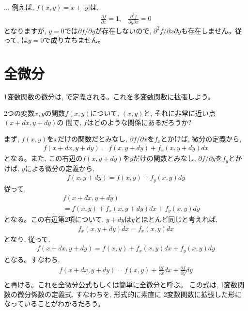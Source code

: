 \begin{faq}{\small{}\\
... 例えば, $f(x, y)=x+|y|$は, 
\begin{eqnarray*}
\frac{\partial f}{\partial x}=1,\,\,\,\,\,
\frac{\partial^2 f}{\partial y\partial x}=0
\end{eqnarray*}
となりますが, $y=0$では$\partial f/\partial y$が存在しないので, 
$\partial^2 f/\partial x\partial y$も存在しません。従って, 
は$y=0$で成り立ちません。}\end{faq}
\vv


\section{全微分}

1変数関数の微分は, で定義される。これを多変数関数に拡張しよう。

2つの変数$x, y$の関数$f(x,y)$について, $(x, y)$と, それに非常に近い点$(x+dx, y+dy)$の
間で, $f$はどのような関係にあるだろうか? 

まず, $f(x,y)$を$x$だけの関数だとみなし, $\partial f/\partial x$を$f_x$とかけば, 微分の定義から, 
\begin{eqnarray*}f(x+dx,y+dy) = f(x,y+dy) + f_x(x, y+dy)dx\end{eqnarray*}
となる。また, この右辺の$f(x,y+dy)$を$y$だけの関数とみなし, $\partial f/\partial y$を$f_y$とかけば, 
$y$による微分の定義から, 
\begin{eqnarray*}f(x,y+dy) = f(x, y) + f_y(x, y)dy\end{eqnarray*}
従って, 
\begin{eqnarray*}
&&f(x+dx,y+dy)\\
&&= f(x, y) + f_x(x, y+dy)dx + f_y(x, y)dy\end{eqnarray*}
となる。この右辺第2項について, $y+dy$は$y$とほとんど同じと考えれば, 
\begin{eqnarray*}f_x(x, y+dy)dx = f_x(x, y)dx\end{eqnarray*}
となり, 従って, 
\begin{eqnarray*}f(x+dx,y+dy) = f(x, y) + f_x(x, y)dx + f_y(x, y)dy\end{eqnarray*}
となる。すなわち, 
\begin{eqnarray}
f(x+dx,y+dy) = f(x, y)+ \frac{\partial f}{\partial x}dx+\frac{\partial f}{\partial y}dy\nonumber\\
\label{eq:def_2var_zenbibun}\end{eqnarray}
と書ける。これを\underline{全微分公式}もしくは簡単に\underline{全微分}と呼ぶ。
この式は, 1変数関数の微分係数の定義式, すなわちを, 形式的に素直に
2変数関数に拡張した形になっていることがわかるだろう。

